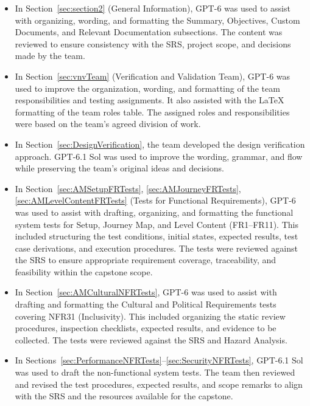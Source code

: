 \documentclass[10pt,titlepage]{article}
\begin{document}
\begin{itemize}
  \item In Section~\ref{sec:section2} (General Information), GPT-6 was used to assist
  with organizing, wording, and formatting the Summary, Objectives,
  Custom Documents, and Relevant Documentation subsections.
  The content was reviewed to ensure consistency with the SRS,
  project scope, and decisions made by the team.

  \item In Section~\ref{sec:vnvTeam} (Verification and Validation Team), GPT-6
  was used to improve the organization, wording, and formatting
  of the team responsibilities and testing assignments. It also
  assisted with the LaTeX formatting of the team roles table.
  The assigned roles and responsibilities were based on the
  team's agreed division of work.

  \item In Section~\ref{sec:DesignVerification}, the team developed the design
  verification approach. GPT-6.1 Sol was used to improve the wording, grammar,
  and flow while preserving the team's original ideas and decisions.

  \item In Section~\ref{sec:AMSetupFRTests}, \ref{sec:AMJourneyFRTests}, \ref{sec:AMLevelContentFRTests} (Tests for Functional Requirements), GPT-6
  was used to assist with drafting, organizing, and formatting
  the functional system tests for Setup, Journey Map, and
  Level Content (FR1--FR11). This included structuring the test
  conditions, initial states, expected results, test case
  derivations, and execution procedures. The tests were reviewed
  against the SRS to ensure appropriate requirement coverage,
  traceability, and feasibility within the capstone scope.

  \item In Section~\ref{sec:AMCulturalNFRTests}, GPT-6 was used to assist
  with drafting and formatting the Cultural and Political
  Requirements tests covering NFR31 (Inclusivity). This included
  organizing the static review procedures, inspection checklists,
  expected results, and evidence to be collected. The tests were
  reviewed against the SRS and Hazard Analysis.

  \item In Sections~\ref{sec:PerformanceNFRTests}--\ref{sec:SecurityNFRTests},
  GPT-6.1 Sol was used to draft the non-functional system tests. The team then
  reviewed and revised the test procedures, expected results, and scope remarks
  to align with the SRS and the resources available for the capstone.


\end{itemize}
\end{document}
